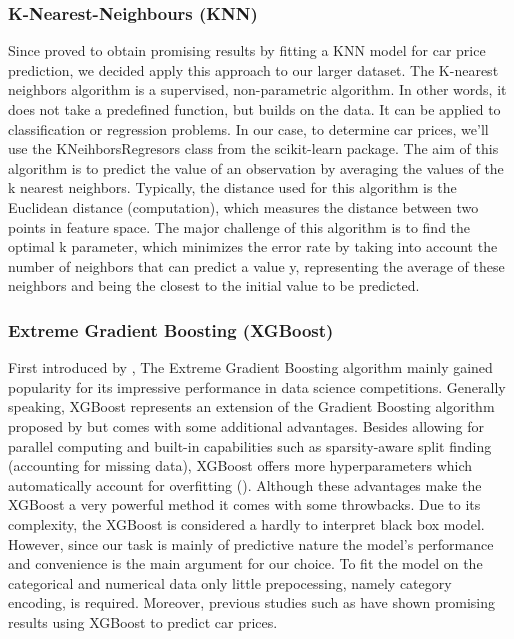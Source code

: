 \documentclass[12pt]{article}
\begin{document}
\subsubsection{K-Nearest-Neighbours (KNN)}
Since \cite{Samruddhi2020} proved to obtain promising results by fitting a KNN model for car price prediction, we decided apply this approach to our larger dataset. The K-nearest neighbors algorithm is a supervised, non-parametric algorithm. In other words, it does not take a predefined function, but builds on the data. It can be applied to classification or regression problems. In our case, to determine car prices, we'll use the KNeihborsRegresors class from the scikit-learn package. 
The aim of this algorithm is to predict the value of an observation by averaging the values of the k nearest neighbors. Typically, the distance used for this algorithm is the Euclidean distance (computation), which measures the distance between two points in feature space. The major challenge of this algorithm is to find the optimal k parameter, which minimizes the error rate by taking into account the number of neighbors that can predict a value y, representing the average of these neighbors and being the closest to the initial value to be predicted.

\subsubsection{Extreme Gradient Boosting (XGBoost)}
First introduced by \cite{Chen2016}, The Extreme Gradient Boosting algorithm mainly gained popularity for its impressive performance in data science competitions. Generally speaking, XGBoost represents an extension of the Gradient Boosting algorithm proposed by \cite{Friedman2001} but comes with some additional advantages. Besides allowing for parallel computing and built-in capabilities such as sparsity-aware split finding (accounting for missing data), XGBoost offers more hyperparameters which  automatically account for overfitting (\cite{Chen2016}). Although these advantages make the XGBoost a very powerful method it comes with some throwbacks. Due to its complexity, the XGBoost is considered a hardly to interpret black box model. However, since our task is mainly of predictive nature the model's performance and convenience is the main argument for our choice. To fit the model on the categorical and numerical data only little prepocessing, namely category encoding, is required. Moreover, previous studies such as \cite{Gajera2021} have shown promising results using XGBoost to predict car prices. 
\end{document}
